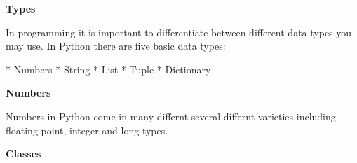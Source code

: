 \documentclass[letterpaper,11pt]{article}
\begin{document}
\textbf{Types}
\par{In programming it is important to differentiate between different data
types you may use. In Python there are five basic data types: }
\begin{itemize}
        * Numbers
        * String
        * List
        * Tuple
        * Dictionary
\end{itemize}
\textbf{Numbers}
\par{Numbers in Python come in many differnt several differnt varieties
including floating point, integer and long types.}
\begin{minipage}{.5\textwidth}
    \small \textbf{Classes}
    \begin{tcolorbox}
    \end{tcolorbox}
\end{minipage}
\end{document}
